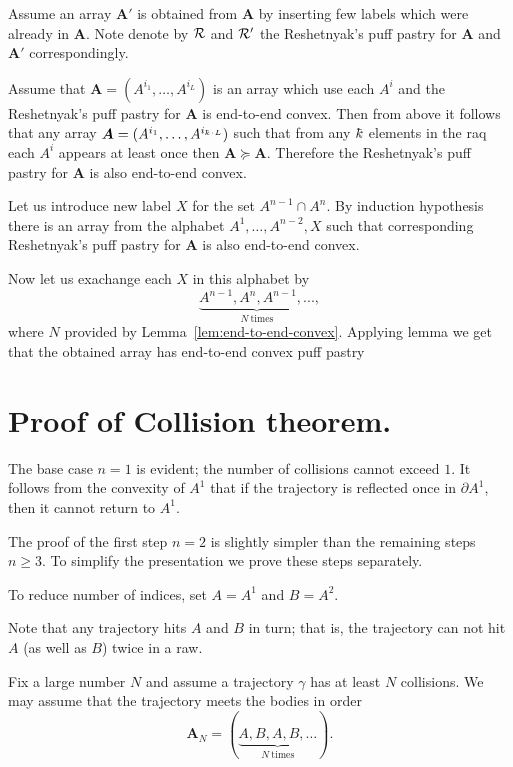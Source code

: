
\qeds


Assume an array $\bm{A}'$ is obtained from $\bm{A}$ by inserting few labels which were already in $\bm{A}$.
Note denote by $\mathcal{R}$ and $\mathcal{R}'$
the  Reshetnyak's puff pastry for $\bm{A}$ and $\bm{A}'$ correspondingly.

Assume that 
$\bm{A}=(A^{i_1},\dots,A^{i_L})$ is an array which use each $A^i$
and the Reshetnyak's puff pastry for $\bm{A}$ is end-to-end convex.
Then from above it follows that any array
$\bm{A}=(A^{i_1},\dots,A^{i_{\kay\cdot L}})$
such that from any $\kay$ elements in the raq each $A^i$ appears at least once then 
$\bm{A}\succeq\bm{A}$.
Therefore the Reshetnyak's puff pastry for $\bm{A}$ is also end-to-end convex.

Let us introduce new label $X$ for the set $A^{n-1}\cap A^n$.
By induction hypothesis there is an array
from the alphabet $A^1,\dots,A^{n-2},X$ such that corresponding 
Reshetnyak's puff pastry for $\bm{A}$ is also end-to-end convex.

Now let us exachange each $X$ in this alphabet by 
\[\underbrace{A^{n-1},A^n,A^{n-1},...}_{N\ \text{times}},\]
where $N$ provided by Lemma~\ref{lem:end-to-end-convex}.
Applying lemma we get that the obtained array has end-to-end convex puff pastry
\qeds



\section{Proof of Collision theorem.}


The base case $n=1$ is evident; the number of collisions cannot exceed $1$.  
It follows from the convexity of $A^1$ that
if the trajectory is reflected once in $\partial A^1$, 
then it cannot return to $A^1$.

The proof of the first step $n=2$ is slightly simpler than the remaining steps $n\ge 3$.
To simplify the presentation we prove these steps separately. 

 To reduce number of indices, set $A=A^1$ and $B=A^2$. 

Note that any trajectory hits $A$ and $B$ in turn;
that is, the trajectory can not hit $A$ (as well as $B$)
twice in a raw.

Fix a large number $N$ and assume a trajectory $\gamma$ has at least $N$ collisions.
We may assume that the trajectory meets the bodies in order \[\bm{A}_N=(\underbrace{A,B,A, B,\dots}_{N\ \text{times}}).\]

